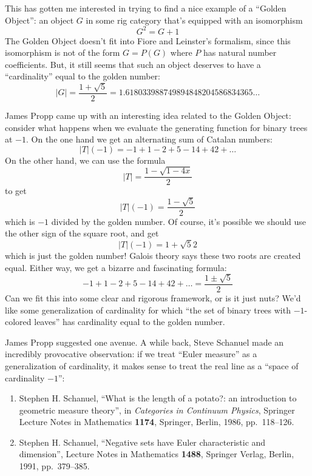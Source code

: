 \documentclass{article}
\begin{document}
This has gotten me interested in trying to find a nice example of a
``Golden Object'': an object \(G\) in some rig category that's equipped
with an isomorphism \[G^2 = G + 1\] The Golden Object doesn't fit into
Fiore and Leinster's formalism, since this isomorphism is not of the
form \(G = P(G)\) where \(P\) has natural number coefficients. But, it
still seems that such an object deserves to have a ``cardinality'' equal
to the golden number:
\[|G| = \frac{1 + \sqrt{5}}{2} = 1.618033988749894848204586834365\ldots\]

James Propp came up with an interesting idea related to the Golden
Object: consider what happens when we evaluate the generating function
for binary trees at \(-1\). On the one hand we get an alternating sum of
Catalan numbers: \[|T|(-1) = -1 + 1 - 2 + 5 - 14 + 42 + \ldots\] On the
other hand, we can use the formula \[|T| = \frac{1 - \sqrt{1 - 4x}}{2}\]
to get \[|T|(-1) = \frac{1 - \sqrt{5}}{2}\] which is \(-1\) divided by
the golden number. Of course, it's possible we should use the other sign
of the square root, and get \[|T|(-1) = {1 + \sqrt{5}}{2}\] which is
just the golden number! Galois theory says these two roots are created
equal. Either way, we get a bizarre and fascinating formula:
\[- 1 + 1 - 2 + 5 - 14 + 42 + \ldots = \frac{1\pm\sqrt{5}}{2}\] Can we
fit this into some clear and rigorous framework, or is it just nuts?
We'd like some generalization of cardinality for which ``the set of
binary trees with \(-1\)-colored leaves'' has cardinality equal to the
golden number.

James Propp suggested one avenue. A while back, Steve Schanuel made an
incredibly provocative observation: if we treat ``Euler measure'' as a
generalization of cardinality, it makes sense to treat the real line as
a ``space of cardinality \(-1\)'':

\begin{enumerate}
\def\labelenumi{\arabic{enumi})}
\setcounter{enumi}{5}
\item
  Stephen H. Schanuel, ``What is the length of a potato?: an
  introduction to geometric measure theory'', in \emph{Categories in
  Continuum Physics}, Springer Lecture Notes in Mathematics
  \textbf{1174}, Springer, Berlin, 1986, pp.~118--126.
\item
  Stephen H. Schanuel, ``Negative sets have Euler characteristic and
  dimension'', Lecture Notes in Mathematics \textbf{1488}, Springer
  Verlag, Berlin, 1991, pp.~379--385.
\end{enumerate}
\end{document}
